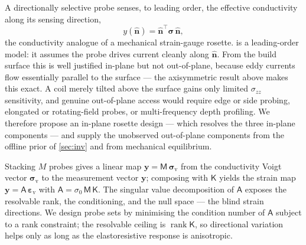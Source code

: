 \documentclass[preprint]{elsarticle}
\newcommand{\eps}{\bm{\varepsilon}}
\newcommand{\sig}{\bm{\sigma}}
\newcommand{\Kt}{\mathsf{K}}
\begin{document}
A directionally selective probe senses, to leading order, the effective
conductivity along its sensing direction,
\begin{equation}
  y(\hat{\bm n}) = \hat{\bm n}^{\!\top}\sig\,\hat{\bm n},
  \label{eq:proj}
\end{equation}
the conductivity analogue of a mechanical strain-gauge rosette.
 is a leading-order model: it assumes the probe drives current
cleanly along $\hat{\bm n}$. From the build surface this is well justified
in-plane but not out-of-plane, because eddy currents flow essentially parallel to the surface --- the axisymmetric result above makes this exact. 
A coil merely tilted above the surface gains only limited $\sigma_{zz}$
sensitivity, and genuine out-of-plane access would require edge or side probing,
elongated or rotating-field probes, or multi-frequency depth profiling. We
therefore propose an in-plane rosette design --- which resolves the three in-plane components --- and supply the unobserved out-of-plane components from the offline
prior of \cref{sec:inv} and from mechanical equilibrium.

Stacking $M$ probes gives a linear map
$\bm y=\mathsf{M}\,\bm\sigma_{\mathrm v}$ from the conductivity Voigt vector
$\bm\sigma_{\mathrm v}$ to the measurement vector $\bm y$; composing with $\Kt$
yields the strain map $\bm y=\mathsf{A}\,\eps_{\mathrm v}$ with
$\mathsf{A}=\sigma_0\,\mathsf{M}\,\Kt$. The singular value decomposition of
$\mathsf A$ exposes the resolvable rank, the conditioning, and the null space
--- the blind strain directions. We design probe sets by minimising the
condition number of $\mathsf A$ subject to a rank constraint; the resolvable
ceiling is $\operatorname{rank}\Kt$, so directional variation helps only as long as the elastoresistive response is anisotropic.
\end{document}

